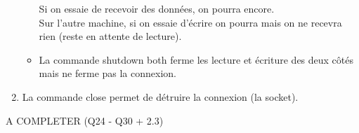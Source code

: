 \documentclass{article}
\begin{document}
\begin{enumerate}[resume]
\begin{itemize}
Si on essaie de recevoir des données, on pourra encore.\\

Sur l'autre machine, si on essaie d'écrire on pourra mais on ne recevra rien (reste en attente de lecture).
	\item La commande shutdown both ferme les lecture et écriture des deux côtés mais ne ferme pas la connexion.
	\end{itemize}
	
	\item La commande close permet de détruire la connexion (la socket).
	

\end{enumerate}
A COMPLETER (Q24 - Q30 + 2.3)
\end{document}
